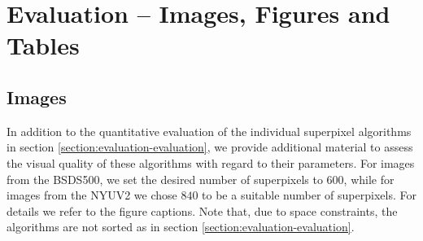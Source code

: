 \chapter{Evaluation -- Images, Figures and Tables}
\label{chapter:appendix-evaluation}

\section{Images}

In addition to the quantitative evaluation of the individual superpixel algorithms in section \ref{section:evaluation-evaluation}, we provide additional material to assess the visual quality of these algorithms with regard to their parameters. For images from the BSDS500, we set the desired number of superpixels to $600$, while for images from the NYUV2 we chose $840$ to be a suitable number of superpixels. For details we refer to the figure captions. Note that, due to space constraints, the algorithms are not sorted as in section \ref{section:evaluation-evaluation}.
